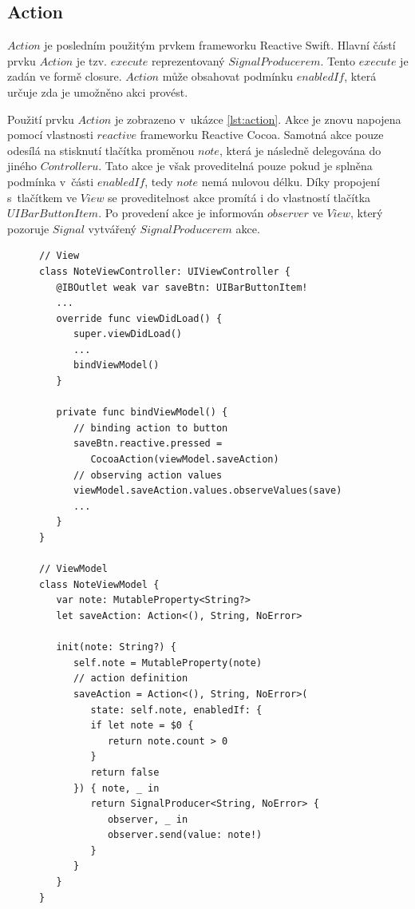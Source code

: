 \documentclass[thesis=M,czech]{FITthesis}[2012/06/26]
\begin{document}
\subsection{Action}
$Action$ je posledním použitým prvkem frameworku Reactive Swift. Hlavní částí prvku $Action$ je tzv. $execute$ reprezentovaný $SignalProducerem$. Tento $execute$ je zadán ve formě closure. $Action$ může obsahovat podmínku $enabledIf$, která určuje zda je umožněno akci provést.

Použití prvku $Action$ je zobrazeno v~ukázce \ref{lst:action}. Akce je znovu napojena pomocí vlastnosti $reactive$ frameworku Reactive Cocoa. Samotná akce pouze odesílá na stisknutí tlačítka proměnou $note$, která je následně delegována do jiného $Controlleru$. Tato akce je však proveditelná pouze pokud je splněna podmínka v~části $enabledIf$, tedy $note$ nemá nulovou délku. Díky propojení s~tlačítkem ve $View$ se proveditelnost akce promítá i do vlastností tlačítka $UIBarButtonItem$. Po provedení akce je informován $observer$ ve $View$, který pozoruje $Signal$ vytvářený $SignalProducerem$ akce.

\begin{figure}
\begin{minipage}{\linewidth}
\begin{lstlisting}[caption={Ukázka použití Action},label={lst:action}]
// View
class NoteViewController: UIViewController {
   @IBOutlet weak var saveBtn: UIBarButtonItem!
   ...
   override func viewDidLoad() {
      super.viewDidLoad()
      ...
      bindViewModel()
   }
   
   private func bindViewModel() {
      // binding action to button
      saveBtn.reactive.pressed = 
         CocoaAction(viewModel.saveAction)
      // observing action values
      viewModel.saveAction.values.observeValues(save)
      ...
   }  
} 

// ViewModel
class NoteViewModel {
   var note: MutableProperty<String?>
   let saveAction: Action<(), String, NoError>
   
   init(note: String?) {
      self.note = MutableProperty(note)
      // action definition
      saveAction = Action<(), String, NoError>(
         state: self.note, enabledIf: {
         if let note = $0 {
            return note.count > 0
         }
         return false
      }) { note, _ in
         return SignalProducer<String, NoError> { 
            observer, _ in
            observer.send(value: note!)
         }
      }
   }
}
\end{lstlisting}
\end{minipage}
\end{figure}	
\end{document}
